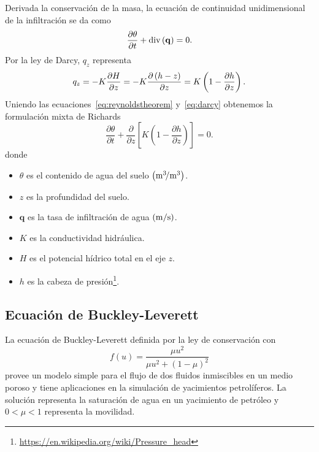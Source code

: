 Derivada la conservación de la masa, la ecuación de continuidad
unidimensional de la infiltración se da como~\cite{Tan2018}
\begin{equation}\label{eq:reynoldstheorem}
	\diffp{\theta}{t}+
	\operatorname{div}\left(\mathbf{q}\right)=
	0.
\end{equation}
Por la ley de Darcy, $q_{z}$ representa
\begin{equation}\label{eq:darcy}
	q_{z}=
	-K\diffp{H}{z}=
	-K\diffp{\left(h-z\right)}{z}=
	K\left(
	1-
	\diffp{h}{z}
	\right).
\end{equation}
Uniendo las ecuaciones~\eqref{eq:reynoldstheorem} y~\eqref{eq:darcy}
obtenemos la formulación mixta de Richards
\begin{equation*}
	\frac{\partial\theta}{\partial t}+
	\frac{\partial}{\partial z}
	\left[K\left(1-\frac{\partial h}{\partial z}\right)\right]=0.
\end{equation*}
donde
\begin{itemize}
	\item $\theta$ es el contenido de agua del suelo $\left(\unit[per-mode=symbol]{\cubic\metre\per\cubic\metre}\right)$.
	\item $z$ es la profundidad del suelo.
	\item $\mathbf{q}$ es la tasa de infiltración de agua $\left(\unit[per-mode=symbol]{\metre\per\second}\right)$.
	\item $K$ es la conductividad hidráulica.
	\item $H$ es el potencial hídrico total en el eje $z$.
	\item $h$ es la cabeza de presión\footnote{\url{https://en.wikipedia.org/wiki/Pressure_head}}.
\end{itemize}

\subsection*{Ecuación de Buckley-Leverett}

La ecuación de Buckley-Leverett definida por la ley de conservación
con
\begin{equation*}
	f\left(u\right)=
	\frac{\mu u^{2}}{\mu u^{2}+{\left(1-\mu\right)}^{2}}
\end{equation*}
provee un modelo simple para el flujo de dos fluidos inmiscibles en
un medio poroso y tiene aplicaciones en la simulación de yacimientos
petrolíferos.
La solución representa la saturación de agua en un yacimiento de
petróleo y $0<\mu<1$ representa la movilidad.

